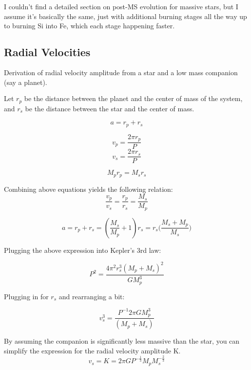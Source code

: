 I couldn't find a detailed section on post-MS evolution for massive stars, but I assume it's 
basically the same, just with additional burning stages all the way up to burning Si into Fe, 
which each stage happening faster.


\subsection{Radial Velocities}

Derivation of radial velocity amplitude from a star and a low mass companion (say a planet).

Let $r_p$ be the distance between the planet and the center of mass of the system, and $r_s$ be the distance between the star and the center of mass.

\begin{equation}
a = r_p + r_s
\end{equation}

\begin{equation}
v_p = \frac{2\pi r_p}{P}
\end{equation}
\begin{equation}
v_s = \frac{2\pi r_s}{P}
\end{equation}

\begin{equation}
M_pr_p = M_sr_s
\end{equation}

Combining above equations yields the following relation:
\begin{equation}
\frac{v_p}{v_s} = \frac{r_p}{r_s} = \frac{M_s}{M_p}
\end{equation} 

\begin{equation}
a = r_p + r_s = (\frac{M_s}{M_p} + 1)r_s = r_s\big(\frac{M_s + M_p}{M_s}\big)
\end{equation}

Plugging the above expression into Kepler's 3rd law:

\begin{equation}
P^2 = \frac{4\pi^2r_s^3(M_p + M_s)^2}{GM_p^3}
\end{equation}

Plugging in for $r_s$ and rearranging a bit:

\begin{equation}
v_s^3 = \frac{P^{-1}2\pi GM_p^3}{(M_p + M_s)}
\end{equation}

By assuming the companion is significantly less massive than the star, you can simplify the expression for the radial velocity amplitude K.  
\begin{equation}
v_s = K = 2\pi G P^{-\frac{1}{3}}M_pM_s^{-\frac{2}{3}}
\end{equation}

